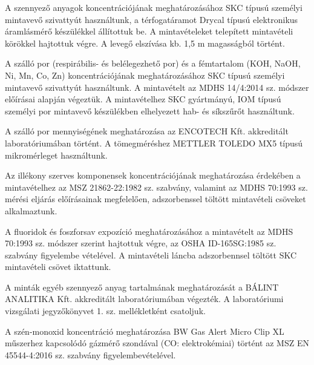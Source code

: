 \documentclass[a4paper,12pt]{article}
\begin{document}
	\begin{adjustwidth}{1cm}{0cm}
		\vspace{1.0em} %
		
		A szennyező anyagok koncentrációjának meghatározásához SKC típusú személyi mintavevő szivattyút használtunk, a térfogatáramot Drycal típusú elektronikus áramlásmérő készülékkel állítottuk be. A mintavételeket telepített mintavételi körökkel hajtottuk végre. A levegő elszívása kb. 1,5 m magasságból történt.
		
		\vspace{1.0em}
		
		A szálló por (respirábilis- és belélegezhető por) és a fémtartalom (KOH, NaOH, Ni, Mn, Co, Zn) koncentrációjának meghatározásához SKC típusú személyi mintavevő szivattyút használtunk. A mintavételt az MDHS 14/4:2014 sz. módszer előírásai alapján végeztük. A mintavételhez SKC gyártmányú, IOM típusú személyi por mintavevő készülékben elhelyezett hab- és síkszűrőt használtunk.
		
		\vspace{1.0em}
		
		A szálló por mennyiségének meghatározása az ENCOTECH Kft. akkreditált laboratóriumában történt. A tömegméréshez METTLER TOLEDO MX5 típusú mikromérleget használtunk.
		
		\vspace{1.0em}
		
		Az illékony szerves komponensek koncentrációjának meghatározása érdekében a mintavételhez az MSZ 21862-22:1982 sz. szabvány, valamint az MDHS 70:1993 sz. mérési eljárás előírásainak megfelelően, adszorbenssel töltött mintavételi csöveket alkalmaztunk.
		
		\vspace{1.0em}
		
		A fluoridok és foszforsav expozíció meghatározásához a mintavételt az MDHS 70:1993 sz. módszer szerint hajtottuk végre, az OSHA ID-165SG:1985 sz. szabvány figyelembe vételével. A mintavételi láncba adszorbennsel töltött SKC mintavételi csövet iktattunk.
		
		\vspace{1.0em}
		
		A minták egyéb szennyező anyag tartalmának meghatározását a BÁLINT ANALITIKA Kft. akkreditált laboratóriumában végezték. A laboratóriumi vizsgálati jegyzőkönyvet 1. sz. mellékletként csatoljuk.
		
		\vspace{1.0em}
		
		A szén-monoxid koncentráció meghatározása BW Gas Alert Micro Clip XL műszerhez kapcsolódó gázmérő szondával (CO: elektrokémiai) történt az MSZ EN 45544-4:2016 sz. szabvány figyelembevételével.
		
	\end{adjustwidth}
	
\end{document}
